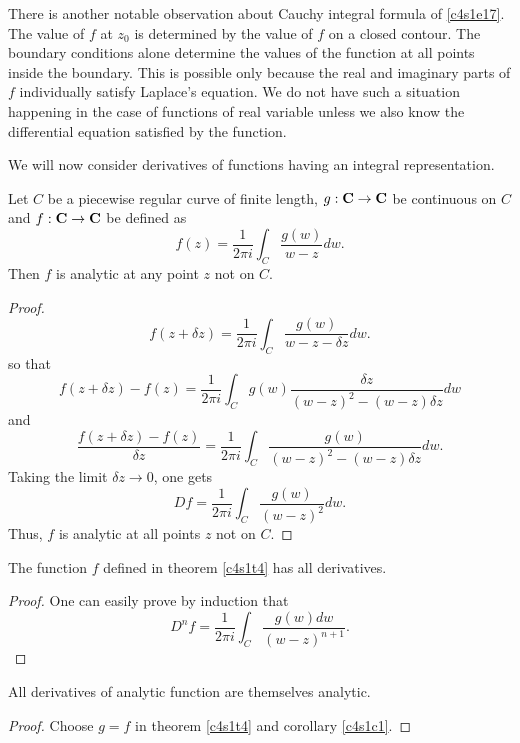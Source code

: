 There is another notable observation about Cauchy integral formula of 
\eqref{c4s1e17}. The value of $f$ at $z_0$ is determined by the value of $f$
on a closed contour. The boundary conditions alone determine the values of the
function at all points inside the boundary. This is possible only because the
real and imaginary parts of $f$ individually satisfy Laplace's equation. We do
not have such a situation happening in the case of functions of real variable 
unless we also know the differential equation satisfied by the function.

We will now consider derivatives of functions having an integral representation.
\begin{thm}\label{c4s1t4}
Let $C$ be a piecewise regular curve of finite length, $g: \mathbf{C}\rightarrow\mathbf{C}$
be continuous on $C$ and $f:\mathbf{C}\rightarrow\mathbf{C}$ be defined as
\[
f(z) = \frac{1}{2\pi i}\int_C \frac{g(w)}{w - z}dw.
\]
Then $f$ is analytic at any point $z$ not on $C$.
\end{thm}
\begin{proof}
\[
f(z + \delta z) = \frac{1}{2\pi i}\int_C \frac{g(w)}{w - z - \delta z}dw.
\]
so that
\[
f(z + \delta z) - f(z) = \frac{1}{2\pi i}\int_C g(w)\frac{\delta z}{(w - z)^2
- (w - z)\delta z}dw
\]
and
\[
\frac{f(z+\delta z) - f(z)}{\delta z} = \frac{1}{2\pi i}
\int_C \frac{g(w)}{(w - z)^2 - (w - z)\delta z}dw.
\]
Taking the limit $\delta z \rightarrow 0$, one gets
\[
Df = \frac{1}{2\pi i}\int_C \frac{g(w)}{(w - z)^2}dw.
\]
Thus, $f$ is analytic at all points $z$ not on $C$.
\end{proof}

\begin{cor}\label{c4s1c1}
The function $f$ defined in theorem \eqref{c4s1t4} has all derivatives.
\end{cor}
\begin{proof}
One can easily prove by induction that
\[
D^nf = \frac{1}{2\pi i}\int_C \frac{g(w)dw}{(w - z)^{n+1}}.
\]
\end{proof}

\begin{cor}\label{c4s1c2}
All derivatives of analytic function are themselves analytic.
\end{cor}
\begin{proof}
Choose $g = f$ in theorem \ref{c4s1t4} and corollary \ref{c4s1c1}.
\end{proof}

